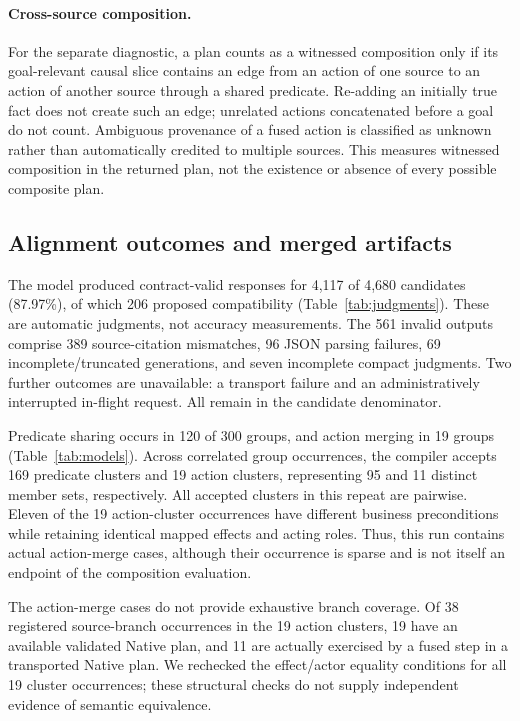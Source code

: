 \paragraph{Cross-source composition.}
For the separate diagnostic, a plan counts as a witnessed composition only if its goal-relevant causal slice contains an edge from an action of one source to an action of another source through a shared predicate. Re-adding an initially true fact does not create such an edge; unrelated actions concatenated before a goal do not count. Ambiguous provenance of a fused action is classified as unknown rather than automatically credited to multiple sources. This measures witnessed composition in the returned plan, not the existence or absence of every possible composite plan.

\subsection{Alignment outcomes and merged artifacts}

The model produced contract-valid responses for 4,117 of 4,680 candidates (87.97\%), of which 206 proposed compatibility (Table~\ref{tab:judgments}). These are automatic judgments, not accuracy measurements. The 561 invalid outputs comprise 389 source-citation mismatches, 96 JSON parsing failures, 69 incomplete/truncated generations, and seven incomplete compact judgments. Two further outcomes are unavailable: a transport failure and an administratively interrupted in-flight request. All remain in the candidate denominator.



Predicate sharing occurs in 120 of 300 groups, and action merging in 19 groups (Table~\ref{tab:models}). Across correlated group occurrences, the compiler accepts 169 predicate clusters and 19 action clusters, representing 95 and 11 distinct member sets, respectively. All accepted clusters in this repeat are pairwise. Eleven of the 19 action-cluster occurrences have different business preconditions while retaining identical mapped effects and acting roles. Thus, this run contains actual action-merge cases, although their occurrence is sparse and is not itself an endpoint of the composition evaluation.



The action-merge cases do not provide exhaustive branch coverage. Of 38 registered source-branch occurrences in the 19 action clusters, 19 have an available validated Native plan, and 11 are actually exercised by a fused step in a transported Native plan. We rechecked the effect/actor equality conditions for all 19 cluster occurrences; these structural checks do not supply independent evidence of semantic equivalence.

